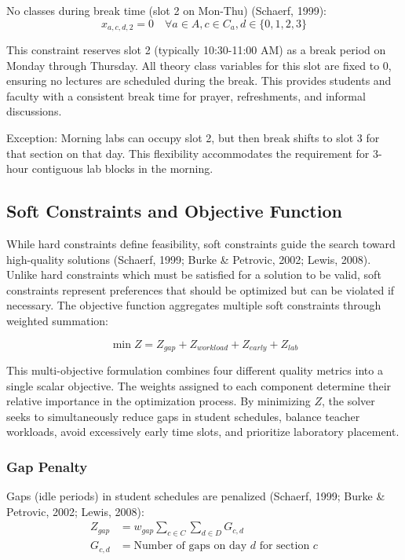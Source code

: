 \documentclass[12pt,a4paper]{article}
\begin{document}
No classes during break time (slot 2 on Mon-Thu) (Schaerf, 1999):
\begin{equation}
x_{a,c,d,2} = 0 \quad \forall a \in A, c \in C_a, d \in \{0,1,2,3\}
\end{equation}

This constraint reserves slot 2 (typically 10:30-11:00 AM) as a break period on Monday through Thursday. All theory class variables for this slot are fixed to 0, ensuring no lectures are scheduled during the break. This provides students and faculty with a consistent break time for prayer, refreshments, and informal discussions.

Exception: Morning labs can occupy slot 2, but then break shifts to slot 3 for that section on that day. This flexibility accommodates the requirement for 3-hour contiguous lab blocks in the morning.

\subsection{Soft Constraints and Objective Function}

While hard constraints define feasibility, soft constraints guide the search toward high-quality solutions (Schaerf, 1999; Burke \& Petrovic, 2002; Lewis, 2008). Unlike hard constraints which must be satisfied for a solution to be valid, soft constraints represent preferences that should be optimized but can be violated if necessary. The objective function aggregates multiple soft constraints through weighted summation:

\begin{equation}
\min Z = Z_{gap} + Z_{workload} + Z_{early} + Z_{lab}
\end{equation}

This multi-objective formulation combines four different quality metrics into a single scalar objective. The weights assigned to each component determine their relative importance in the optimization process. By minimizing $Z$, the solver seeks to simultaneously reduce gaps in student schedules, balance teacher workloads, avoid excessively early time slots, and prioritize laboratory placement.

\subsubsection{Gap Penalty}

Gaps (idle periods) in student schedules are penalized (Schaerf, 1999; Burke \& Petrovic, 2002; Lewis, 2008):
\begin{align}
Z_{gap} &= w_{gap} \sum_{c \in C} \sum_{d \in D} G_{c,d} \\
G_{c,d} &= \text{Number of gaps on day } d \text{ for section } c
\end{align}
\end{document}
